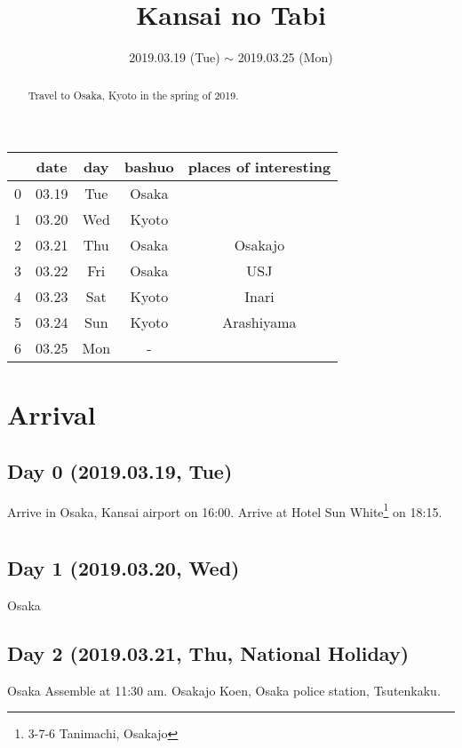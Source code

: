 \documentclass{article}
\title{Kansai no Tabi}
\date{2019.03.19 (Tue) $\sim$ 2019.03.25 (Mon)}
\begin{document}
\maketitle

\begin{abstract}
Travel to Osaka, Kyoto in the spring of 2019.
\end{abstract}

\begin{tabular}{ c | c | c | c | c }
  & date   & day  & bashuo & places of interesting \\\hline
0 & 03.19  & Tue  & Osaka & \\
1 & 03.20  & Wed  & Kyoto & \\
2 & 03.21  & Thu  & Osaka & Osakajo \\
3 & 03.22  & Fri  & Osaka & USJ \\
4 & 03.23  & Sat  & Kyoto & Inari \\
5 & 03.24  & Sun  & Kyoto & Arashiyama \\
6 & 03.25  & Mon  & - & \\
\end{tabular}


\section{Arrival}
\subsection{Day 0 (2019.03.19, Tue)}
Arrive in Osaka, Kansai airport on 16:00.
Arrive at Hotel Sun White\footnote{3-7-6 Tanimachi, Osakajo} on 18:15.

\section{}
\subsection{Day 1 (2019.03.20, Wed)}
Osaka

\subsection{Day 2 (2019.03.21, Thu, National Holiday)}
Osaka
Assemble at 11:30 am.
Osakajo Koen, Osaka police station, Tsutenkaku.
\end{document}
